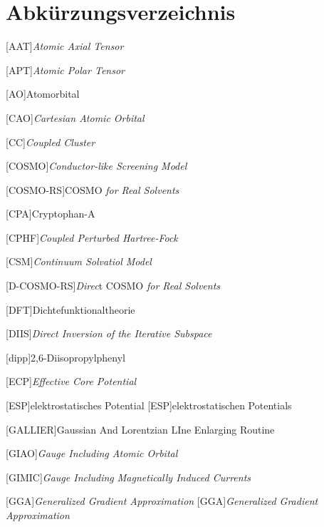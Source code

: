  {}
\renewcommand\refname{Abkürzungsverzeichnis} \chapter*{Abkürzungsverzeichnis}
\begin{acronym}[SEPSEP] %
    \setlength{\itemsep}{0.2cm} %
    
    [AAT]{\textit{Atomic Axial Tensor}}
    
    [APT]{\textit{Atomic Polar Tensor}}
    
    [AO]{Atomorbital}
	
	[CAO]{\textit{Cartesian Atomic Orbital}}
		
    [CC]{\textit{Coupled Cluster}}		
		
 	[COSMO]{\textit{Conductor-like Screening Model}}
 	
 	[COSMO-RS]{COSMO \textit{for Real Solvents}}

    [CPA]{Cryptophan-A} 	
 	
	[CPHF]{\textit{Coupled Perturbed Hartree-Fock}}
	
	[CSM]{\textit{Continuum Solvatiol Model}}
	
	[D-COSMO-RS]{\textit{Direc}t COSMO \textit{for Real Solvents}}
 	
    [DFT]{Dichtefunktionaltheorie}
    
    [DIIS]{\textit{Direct Inversion of the Iterative Subspace}}
    
    [dipp]{2,6-Diisopropylphenyl}
    
    [ECP]{\textit{Effective Core Potential}}
    
    [ESP]{elektrostatisches Potential}
	    [ESP]{elektrostatischen Potentials}

	[GALLIER]{Gaussian And Lorentzian LIne Enlarging Routine}
	
	[GIAO]{\textit{Gauge Including Atomic Orbital}}   
	
	[GIMIC]{\textit{Gauge Including Magnetically Induced Currents}} 

	[GGA]{\textit{Generalized Gradient Approximation}}   
		[GGA]{\textit{Generalized Gradient Approximation}}
	

\end{acronym}
